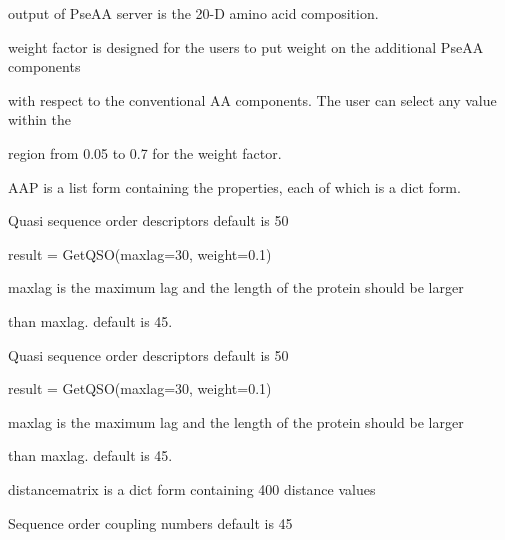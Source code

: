 \documentclass[letterpaper,10pt,english]{sphinxmanual}
\begin{document}
\begin{fulllineitems}
\begin{fulllineitems}
\begin{enumerate}
\end{enumerate}

output of PseAA server is the 20-D amino acid composition.

weight factor is designed for the users to put weight on the additional PseAA components

with respect to the conventional AA components. The user can select any value within the

region from 0.05 to 0.7 for the weight factor.

AAP is a list form containing the properties, each of which is a dict form.

\end{fulllineitems}


\begin{fulllineitems}
\label{reference/PyProteinclass:PyProtein.PyProtein.GetQSO}
Quasi sequence order descriptors  default is 50

result = GetQSO(maxlag=30, weight=0.1)

maxlag is the maximum lag and the length of the protein should be larger

than maxlag. default is 45.

\end{fulllineitems}


\begin{fulllineitems}
\label{reference/PyProteinclass:PyProtein.PyProtein.GetQSOp}
Quasi sequence order descriptors  default is 50

result = GetQSO(maxlag=30, weight=0.1)

maxlag is the maximum lag and the length of the protein should be larger

than maxlag. default is 45.

distancematrix is a dict form containing 400 distance values

\end{fulllineitems}


\begin{fulllineitems}
\label{reference/PyProteinclass:PyProtein.PyProtein.GetSOCN}
Sequence order coupling numbers  default is 45


\end{fulllineitems}
\end{fulllineitems}
\end{document}
